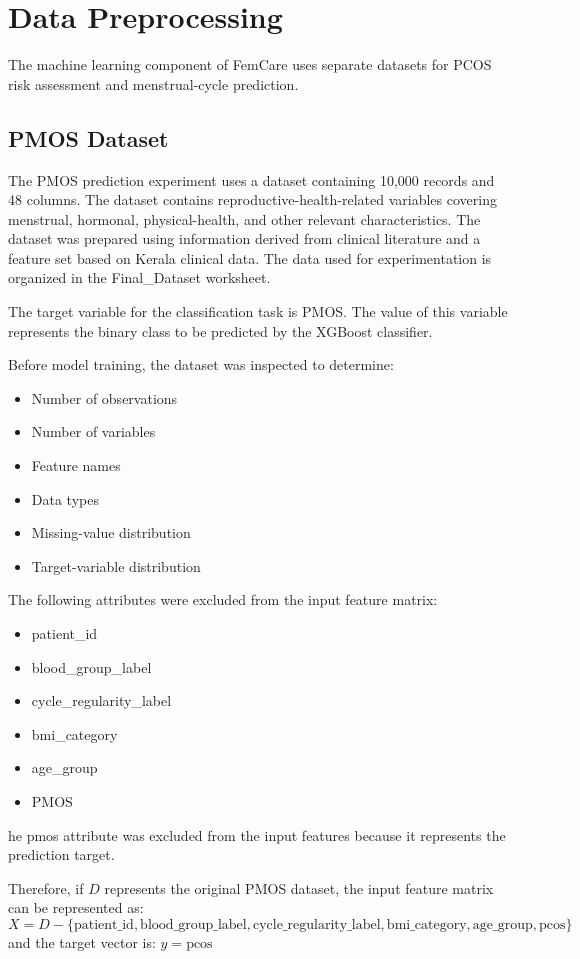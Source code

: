 \section{Data Preprocessing}
\label{sec:datapre}
The machine learning component of FemCare uses separate datasets for PCOS risk assessment and menstrual-cycle prediction.

\subsection{PMOS Dataset}
The PMOS prediction experiment uses a dataset containing 10,000 records and 48 columns. The dataset contains reproductive-health-related variables covering menstrual, hormonal, physical-health, and other relevant characteristics. The dataset was prepared using information derived from clinical literature and a feature set based on Kerala clinical data. The data used for experimentation is organized in the Final\_Dataset worksheet.

The target variable for the classification task is PMOS. The value of this variable represents the binary class to be predicted by the XGBoost classifier.

Before model training, the dataset was inspected to determine:
\begin{itemize}
    \item Number of observations
    \item Number of variables
    \item Feature names
    \item Data types
    \item Missing-value distribution
    \item Target-variable distribution
\end{itemize}
The following attributes were excluded from the input feature matrix:
\begin{itemize}
    \item patient\_id
    \item blood\_group\_label
    \item cycle\_regularity\_label
    \item bmi\_category
    \item age\_group
    \item PMOS
\end{itemize}
he pmos attribute was excluded from the input features because it represents the prediction target.

Therefore, if $D$ represents the original PMOS dataset, the input feature matrix can be represented as:
\begin{equation}
X = D - \{ \text{patient\_id}, \text{blood\_group\_label}, \text{cycle\_regularity\_label}, \text{bmi\_category}, \text{age\_group}, \text{pcos} \}
\end{equation}
and the target vector is:
$y = \text{pcos}$

